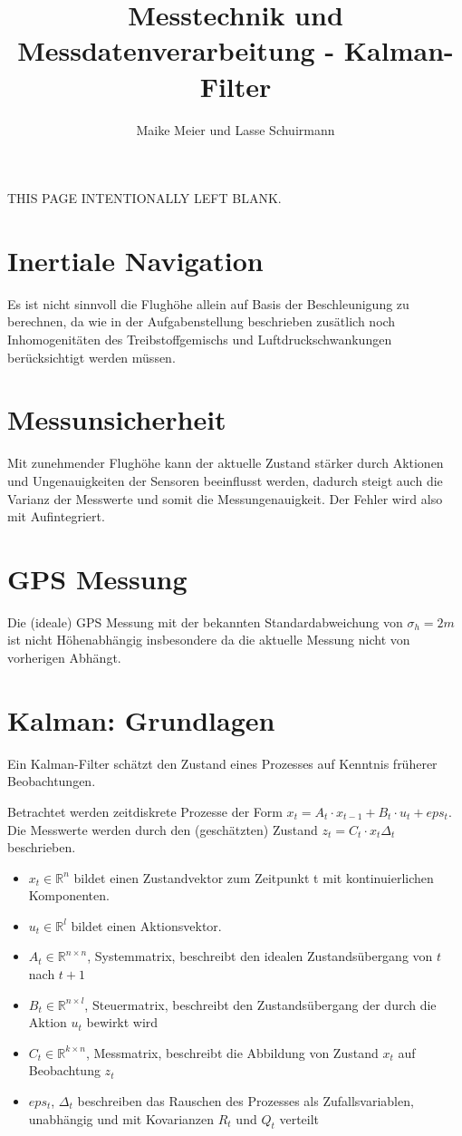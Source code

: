 \documentclass[12pt,a4paper]{article}
\author{Maike Meier und Lasse Schuirmann}
\title{Messtechnik und Messdatenverarbeitung - Kalman-Filter}
\newcommand*{\blankpage}{
  \vspace*{\fill}
  \begin{flushright}
  \tiny THIS PAGE INTENTIONALLY LEFT BLANK.
  \end{flushright}
  \pagebreak
}
\begin{document}
\maketitle
\pagebreak

\blankpage

\section{Inertiale Navigation}
Es ist nicht sinnvoll die Flughöhe allein auf Basis der Beschleunigung zu berechnen, da wie in der Aufgabenstellung beschrieben zusätlich noch Inhomogenitäten des Treibstoffgemischs und Luftdruckschwankungen berücksichtigt werden müssen.

\section{Messunsicherheit}
Mit zunehmender Flughöhe kann der aktuelle Zustand stärker durch Aktionen und 
Ungenauigkeiten der Sensoren beeinflusst werden, dadurch steigt auch die 
Varianz der Messwerte und somit die Messungenauigkeit. Der Fehler wird also mit Aufintegriert.

\section{GPS Messung}
Die (ideale) GPS Messung mit der bekannten Standardabweichung von $\sigma_h = 2m$ ist nicht Höhenabhängig insbesondere da die aktuelle Messung nicht von vorherigen Abhängt.

\section{Kalman: Grundlagen}
Ein Kalman-Filter schätzt den Zustand eines Prozesses auf Kenntnis früherer Beobachtungen.

Betrachtet werden zeitdiskrete Prozesse der Form $x_t = A_t \cdot x_{t-1} + B_t \cdot u_t + eps_t$. Die Messwerte werden durch den (geschätzten) Zustand $z_t = C_t \cdot x_t  \Delta_t$ beschrieben.

\begin{itemize}
\item $x_t \in \mathbb{R}^n$ bildet einen Zustandvektor zum Zeitpunkt t mit kontinuierlichen Komponenten.
\item $u_t \in \mathbb{R}^l$ bildet einen Aktionsvektor.
\item $A_t \in \mathbb{R}^{n \times n}$, Systemmatrix, beschreibt den idealen Zustandsübergang von $t$ nach $t+1$
\item $B_t \in \mathbb{R} ^ {n \times l}$, Steuermatrix, beschreibt den Zustandsübergang der durch die Aktion $u_t$ bewirkt wird
\item $C_t \in \mathbb{R} ^ {k \times n}$, Messmatrix, beschreibt die Abbildung von Zustand $x_t$ auf Beobachtung $z_t$
\item $eps_t$, $\Delta_t$ beschreiben das Rauschen des Prozesses als Zufallsvariablen, unabhängig und mit
Kovarianzen $R_t$ und $Q_t$ verteilt
\end{itemize}
\end{document}
